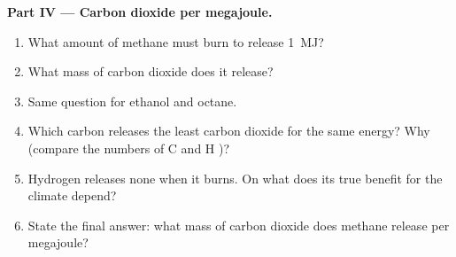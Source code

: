 \begin{problem}
\medskip
\noindent\textbf{Part IV --- Carbon dioxide per megajoule.}
\begin{enumerate}[resume]
  \item What amount of methane must burn to release \qty{1}{MJ}?
  \item What mass of carbon dioxide does it release?
  \item Same question for ethanol and octane.
  \item Which carbon  releases the least carbon dioxide for the same
        energy? Why (compare the numbers of C and H )?
  \item Hydrogen releases none when it burns. On what does its true
        benefit for the climate depend?
  \item State the final answer: what mass of carbon dioxide does methane
        release per megajoule?
\end{enumerate}
\end{problem}
